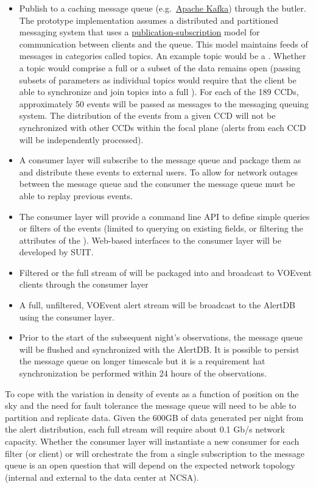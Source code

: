 \begin{itemize}
\item Publish \DIAObjects to a caching message queue (e.g.\ \href{http://kafka.apache.org}{Apache Kafka}) through the butler. The prototype implementation assumes a distributed and partitioned messaging system that uses a \href{https://en.wikipedia.org/wiki/Publish_subscribe_pattern}{publication-subscription} model for communication between clients and the queue. This model maintains feeds of messages in categories called topics. An example topic would be a \DIAObject. Whether a topic would comprise a full \DIAObject or a subset of the data remains open (passing subsets of parameters as individual topics would require that the client be able to synchronize and join topics into a full \DIAObject). For each of the 189 CCDs, approximately 50 events will be passed as messages to the messaging queuing system. The distribution of the events from a given CCD will not be synchronized with other CCDs within the focal plane (alerts from each CCD will be independently processed).

\item A consumer layer will subscribe to the  message queue and package them as \VOEvents and distribute these events to external users. To allow for network outages between the message queue and the consumer the message queue must be able to replay previous events.
\item  The consumer layer will provide a command line API to define simple queries or filters of the events (limited to querying on existing \DIAObject fields, or filtering the attributes of the \DIAObject). Web-based interfaces to the consumer layer will be developed by SUIT.
\item Filtered or the full stream of \DIAObjects will be packaged into \VOEvents and broadcast to VOEvent clients through the consumer layer
\item A full, unfiltered, VOEvent alert stream will be broadcast to the AlertDB using the consumer layer.
\item Prior to the start of the subsequent night's observations, the message queue will be flushed and synchronized with the AlertDB. It is possible to persist the message queue on longer timescale but it is a requirement hat synchronization be performed within 24 hours of the observations.
\end{itemize}

To cope with the variation in density of events as a function of position on the sky and the need for fault tolerance the message queue will need to be able to partition and replicate data. Given the 600GB of data generated per night from the alert distribution, each full \DIAObject stream will require about 0.1 Gb/s network capacity. Whether the consumer layer will instantiate a new consumer for each filter (or client) or will orchestrate the \VOEvents from a single subscription to the message queue is an open question that will depend on the expected network topology (internal and external to the data center at NCSA).

